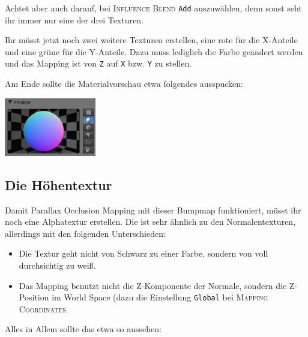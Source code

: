 \documentclass[a4paper]{article}
\newcommand{\ccaption}[1]{\textsc{#1}}
\newcommand{\cvalue}[1]{\texttt{#1}}
\newcommand{\rarrow}{\textrightarrow}
\begin{document}
Achtet aber auch darauf, bei \ccaption{Influence \rarrow Blend} \cvalue{Add} auszuwählen, denn sonst seht ihr immer nur eine der drei Texturen.

Ihr müsst jetzt noch zwei weitere Texturen erstellen, eine rote für die X-Anteile und eine grüne für die Y-Anteile. Dazu muss lediglich die Farbe
geändert werden und das Mapping ist von \cvalue{Z} auf \cvalue{X} bzw. \cvalue{Y} zu stellen.

Am Ende sollte die Materialvorschau etwa folgendes ausspucken:

\begin{center}
\includegraphics[width=40mm]{../images/blender/bumpmap-material-preview.png}
\end{center}

\subsection{Die Höhentextur}
Damit Parallax Occlusion Mapping mit dieser Bumpmap funktioniert, müsst ihr noch eine Alphatextur erstellen. Die ist sehr ähnlich zu den Normalentexturen,
allerdings mit den folgenden Unterschieden:
\begin{itemize}
\item Die Textur geht nicht von Schwarz zu einer Farbe, sondern von voll durchsichtig zu weiß.
\item Das Mapping benutzt nicht die Z-Komponente der Normale, sondern die Z-Position im World Space (dazu die Einstellung \cvalue{Global} bei \ccaption{Mapping \rarrow Coordinates}.
\end{itemize}

Alles in Allem sollte das etwa so aussehen:
\end{document}
